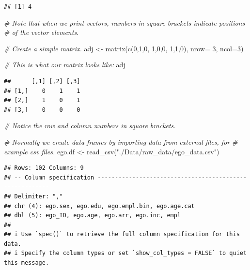 \documentclass[
]{book}
\newenvironment{Shaded}{\begin{snugshade}}{\end{snugshade}}
\newcommand{\AttributeTok}[1]{\textcolor[rgb]{0.77,0.63,0.00}{#1}}
\newcommand{\CommentTok}[1]{\textcolor[rgb]{0.56,0.35,0.01}{\textit{#1}}}
\newcommand{\DecValTok}[1]{\textcolor[rgb]{0.00,0.00,0.81}{#1}}
\newcommand{\FunctionTok}[1]{\textcolor[rgb]{0.00,0.00,0.00}{#1}}
\newcommand{\NormalTok}[1]{#1}
\newcommand{\OtherTok}[1]{\textcolor[rgb]{0.56,0.35,0.01}{#1}}
\newcommand{\StringTok}[1]{\textcolor[rgb]{0.31,0.60,0.02}{#1}}
\begin{document}
\begin{verbatim}
## [1] 4
\end{verbatim}

\begin{Shaded}
\begin{Highlighting}[]
\CommentTok{\# Note that when we print vectors, numbers in square brackets indicate positions}
\CommentTok{\# of the vector elements.}

\CommentTok{\# Create a simple matrix.}
\NormalTok{adj }\OtherTok{\textless{}{-}} \FunctionTok{matrix}\NormalTok{(}\FunctionTok{c}\NormalTok{(}\DecValTok{0}\NormalTok{,}\DecValTok{1}\NormalTok{,}\DecValTok{0}\NormalTok{, }\DecValTok{1}\NormalTok{,}\DecValTok{0}\NormalTok{,}\DecValTok{0}\NormalTok{, }\DecValTok{1}\NormalTok{,}\DecValTok{1}\NormalTok{,}\DecValTok{0}\NormalTok{), }\AttributeTok{nrow=} \DecValTok{3}\NormalTok{, }\AttributeTok{ncol=}\DecValTok{3}\NormalTok{)}

\CommentTok{\# This is what our matrix looks like:}
\NormalTok{adj}
\end{Highlighting}
\end{Shaded}

\begin{verbatim}
##      [,1] [,2] [,3]
## [1,]    0    1    1
## [2,]    1    0    1
## [3,]    0    0    0
\end{verbatim}

\begin{Shaded}
\begin{Highlighting}[]
\CommentTok{\# Notice the row and column numbers in square brackets. }

\CommentTok{\# Normally we create data frames by importing data from external files, for}
\CommentTok{\# example csv files.}
\NormalTok{ego.df }\OtherTok{\textless{}{-}} \FunctionTok{read\_csv}\NormalTok{(}\StringTok{"./Data/raw\_data/ego\_data.csv"}\NormalTok{)}
\end{Highlighting}
\end{Shaded}

\begin{verbatim}
## Rows: 102 Columns: 9
## -- Column specification --------------------------------------------------------
## Delimiter: ","
## chr (4): ego.sex, ego.edu, ego.empl.bin, ego.age.cat
## dbl (5): ego_ID, ego.age, ego.arr, ego.inc, empl
## 
## i Use `spec()` to retrieve the full column specification for this data.
## i Specify the column types or set `show_col_types = FALSE` to quiet this message.
\end{verbatim}
\end{document}
